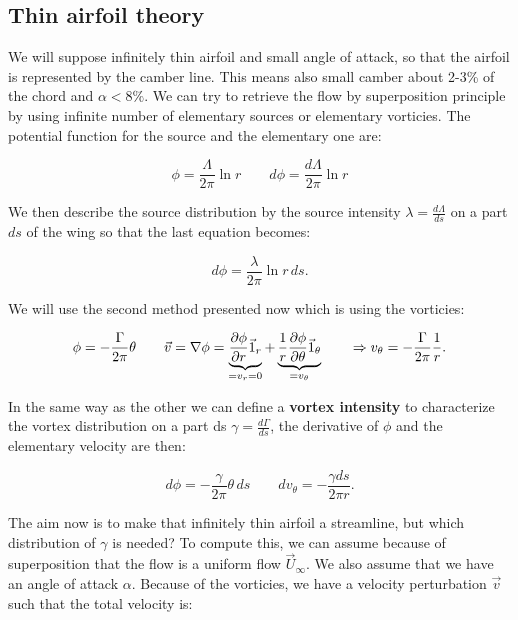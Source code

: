 \subsection{Thin airfoil theory}
	We will suppose infinitely thin airfoil and small angle of attack, so that the airfoil is represented by the camber line. This means also small camber about 2-3\% of the chord and $\alpha <8\%$. We can try to retrieve the flow by superposition principle by using infinite number of elementary sources or elementary vorticies. The potential function for the source and the elementary one are:
	
	\begin{equation}
	\phi = \frac{\Lambda}{2\pi} \ln r \qquad d\phi = \frac{d\Lambda}{2\pi} \ln r
	\end{equation}		
	
	We then describe the source distribution by the source intensity $\lambda = \frac{d\Lambda}{ds}$ on a part $ds$ of the wing so that the last equation becomes:
	
	\begin{equation}
	d\phi = \frac{\lambda}{2\pi} \ln r\, ds.
	\end{equation}
	
	We will use the second method presented now which is using the vorticies: 
	
	\begin{equation}
	\phi = -\frac{\Gamma}{2\pi} \theta \qquad \vec{v} = \nabla \phi = \underbrace{\frac{\D \phi}{\D r} \vec{1}_r}_{= v_r = 0} + \underbrace{\frac{1}{r} \frac{\D \phi}{\D \theta} \vec{1} _\theta}_{= v_\theta} \qquad \Rightarrow v_\theta = -\frac{\Gamma }{2\pi} \frac{1}{r}.
	\end{equation}
	
	In the same way as the other we can define a \textbf{vortex intensity} to characterize the vortex distribution on a part ds $\gamma = \frac{d\Gamma}{ds}$, the derivative of $\phi$ and the elementary velocity are then: 
	
	\begin{equation}
	d\phi = -\frac{\gamma}{2\pi} \theta \, ds \qquad dv_\theta = -\frac{\gamma ds}{2\pi r}.
	\end{equation}
	
	The aim now is to make that infinitely thin airfoil a streamline, but which distribution of $\gamma$ is needed? To compute this, we can assume because of superposition that the flow is a uniform flow $\vec{U}_\infty$. We also assume that we have an angle of attack $\alpha$. Because of the vorticies, we have a velocity perturbation $\vec{v}$ such that the total velocity is: 
	
